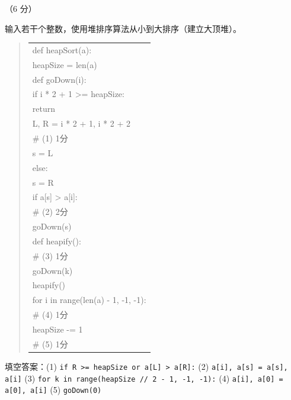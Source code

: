 \begin{question}[堆排序]（6 分）

输入若干个整数，使用堆排序算法从小到大排序（建立大顶堆）。

\begin{quote}
\footnotesize
\begin{tabular}{@{}l@{}}
def heapSort(a):\\
    heapSize = len(a)\\
    def goDown(i):\\
        if i * 2 + 1 >= heapSize:\\
            return\\
        L, R = i * 2 + 1, i * 2 + 2\\
\underline{\hspace{12em}} \# (1) 1分\\
            s = L\\
        else:\\
            s = R\\
        if a[s] > a[i]:\\
\underline{\hspace{12em}} \# (2) 2分\\
            goDown(s)\\
    def heapify():\\
\underline{\hspace{12em}} \# (3) 1分\\
            goDown(k)\\
    heapify()\\
    for i in range(len(a) - 1, -1, -1):\\
\underline{\hspace{12em}} \# (4) 1分\\
        heapSize -= 1\\
\underline{\hspace{12em}} \# (5) 1分\\
\end{tabular}
\end{quote}

\begin{solution}
填空答案：(1) \texttt{if R >= heapSize or a[L] > a[R]:} (2) \texttt{a[i], a[s] = a[s], a[i]} (3) \texttt{for k in range(heapSize // 2 - 1, -1, -1):} (4) \texttt{a[i], a[0] = a[0], a[i]} (5) \texttt{goDown(0)}
\end{solution}
\end{question}

\clearpage
